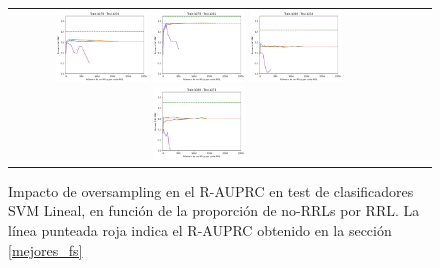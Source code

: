 \begin{figure}[h!]
\begin{tabular}{cccc}
\includegraphics[width=0.25\textwidth]{Kap7/UNIFIED_train=b278_test=b234_linear_curves.png}  \includegraphics[width=0.25\textwidth]{Kap7/UNIFIED_train=b278_test=b261_linear_curves.png} 
 \includegraphics[width=0.25\textwidth]{Kap7/UNIFIED_train=b360_test=b234_linear_curves.png}  \includegraphics[width=0.25\textwidth]{Kap7/UNIFIED_train=b360_test=b278_linear_curves.png} 
\end{tabular}
\caption{Impacto de oversampling en el R-AUPRC en test de clasificadores SVM Lineal, en función de la proporción de no-RRLs por RRL. La línea punteada roja indica el R-AUPRC obtenido en la sección \protect\ref{mejores_fs}}
\label{fig:svm_oversampling}
\end{figure}

